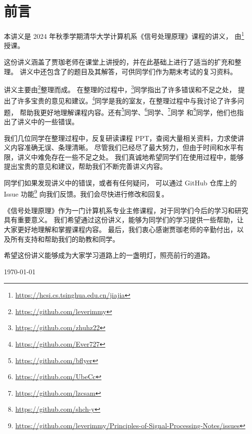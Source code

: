 \section*{前言}

本讲义是 2024 年秋季学期清华大学计算机系《信号处理原理》课程的讲义，
由\footnote{\url{https://hcsi.cs.tsinghua.edu.cn/jiajia}}授课。

这份讲义涵盖了贾珈老师在课堂上讲授的，并在此基础上进行了适当的扩充和整理。
讲义中还包含了的题目及其解答，可供同学们作为期末考试的复习资料。

讲义主要由\footnote{\url{https://github.com/leverimmy}}整理而成。
在整理的过程中，\footnote{\url{https://github.com/zhuhz22}}同学指出了许多错误和不足之处，
提出了许多宝贵的意见和建议。\footnote{\url{https://github.com/Ever727}}同学是我的室友，在整理过程中与我讨论了许多问题，
帮助我更好地理解课程内容。还有\footnote{\url{https://github.com/bflyer}}同学、\footnote{\url{https://github.com/UbeCc}}同学、\footnote{\url{https://github.com/lzcsam}}同学
和\footnote{\url{https://github.com/shch-y}}同学，他们也指出了讲义中的一些错误。

我们几位同学在整理过程中，反复研读课程 PPT，查阅大量相关资料，力求使讲义内容准确无误、条理清晰。
尽管我们已经尽了最大努力，但由于时间和水平有限，讲义中难免存在一些不足之处。
我们真诚地希望同学们在使用过程中，能够提出宝贵的意见和建议，帮助我们不断完善讲义内容。

同学们如果发现讲义中的错误，或者有任何疑问，
可以通过 GitHub 仓库上的 Issue 功能\footnote{\url{https://github.com/leverimmy/Principles-of-Signal-Processing-Notes/issues}}
向我们反馈。我们会尽快进行修改和回复。

《信号处理原理》作为一门计算机系专业主修课程，对于同学们今后的学习和研究具有重要意义。
我们希望通过这份讲义，能够为同学们的学习提供一些帮助，让大家更好地理解和掌握课程内容。
最后，我们衷心感谢贾珈老师的辛勤付出，以及所有支持和帮助我们的助教和同学。

希望这份讲义能够成为大家学习道路上的一盏明灯，照亮前行的道路。

\begin{flushright}
    \today
\end{flushright}
